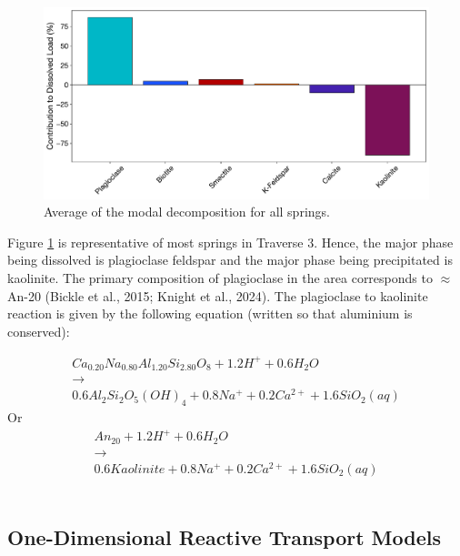 \begin{figure}[h]
    \centering
    \includegraphics[width=\textwidth]{Normalized_Average_Mineral_Volume_Changes.pdf}
    \caption{Average of the modal decomposition for all springs.}
    \label{fig:discussion6}
\end{figure}

\FloatBarrier

Figure \ref{fig:discussion6} is representative of most springs in Traverse 3. Hence, the major phase being dissolved is plagioclase feldspar and the major phase being precipitated is kaolinite. The primary composition of plagioclase in the area corresponds to $\approx$ An-20 (Bickle et al., 2015; Knight et al., 2024).  The plagioclase to kaolinite reaction is given by the following equation (written so that aluminium is conserved):

\begin{equation}
    \begin{matrix}
Ca_{0.20}Na_{0.80}Al_{1.20}Si_{2.80}O_{8} + 1.2H^{+} + 0.6 H_{2}O \\ \rightarrow\\ 0.6 Al_{2}Si_{2}O_{5}(OH)_{4} + 0.8 Na^{+} + 0.2 Ca^{2+} + 1.6 SiO_{2}(aq)
    \end{matrix}
\end{equation}
\quad Or
\begin{equation}
    \begin{matrix}
An_{20} + 1.2 H^{+} + 0.6 H_{2}O\\ \rightarrow\\ 0.6 Kaolinite + 0.8 Na^{+} + 0.2 Ca^{2+} + 1.6 SiO_{2}(aq)
\end{matrix}
\label{eq:10}
\end{equation}\\


\subsection{One-Dimensional Reactive Transport Models}

